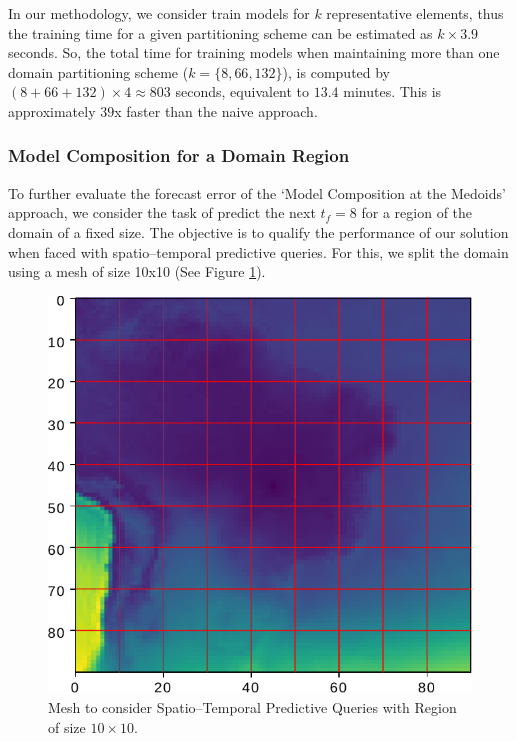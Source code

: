 In our methodology, we consider train models for $k$ representative elements, thus the training time for a given partitioning scheme can be estimated as $k \times 3.9$ seconds. So, the total time for training models when maintaining more than one domain partitioning scheme ($k = \{8, 66, 132\}$), is computed by $(8 + 66  + 132) \times 4 \approx 803$ seconds, equivalent to $13.4$ minutes. This is approximately $39$x faster than the naive approach.

\subsubsection{Model Composition for a Domain Region}
\label{Sec:ModelCompositionAggregated}

To further evaluate the forecast error of the `Model Composition at the Medoids’ approach, we consider the task of predict the next $t_{f}=8$ for a region of the domain of a fixed size. The objective is to qualify the performance of our solution when faced with spatio--temporal predictive queries. For this, we split the domain using a mesh of size 10x10 (See Figure \ref{Fig:Query_10x10_whole_real_brazil}).

\begin{figure}[h]
	\centering
	\includegraphics[scale=0.75]{../Figures/query_10x10_whole_real_brazil}
	\caption{Mesh to consider Spatio--Temporal Predictive Queries with Region of size $10 \times 10$.}
	\label{Fig:Query_10x10_whole_real_brazil}
\end{figure}

